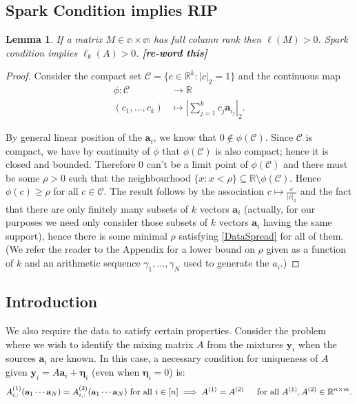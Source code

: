 \documentclass[journal, onecolumn]{IEEEtran}
\newtheorem{lemma}{Lemma}
\begin{document}
\subsection{Spark Condition implies RIP}

\begin{lemma}
If a matrix $M \in \mathbb{n \times m}$ has full column rank then $\ell(M) > 0$. Spark condition implies $\ell_k(A) > 0$. \textbf{[re-word this]}
\end{lemma}

\begin{proof}
Consider the compact set $\mathcal{C} = \{c \in \mathbb{R}^k: |c|_2 = 1\}$ and the continuous map
\begin{align*}
\phi: \mathcal{C} &\to \mathbb{R} \\
(c_1, \ldots, c_k) &\mapsto |\sum_{j = 1}^k c_j \mathbf{a}_{i_j}|_2.
\end{align*}

By general linear position of the $\mathbf{a}_i$, we know that $0 \notin \phi(\mathcal{C})$. Since $\mathcal{C}$ is compact, we have by continuity of $\phi$ that $\phi(\mathcal{C})$ is also compact; hence it is closed and bounded. Therefore $0$ can't be a limit point of $\phi(\mathcal{C})$ and there must be some $\rho > 0$ such that the neighbourhood $\{x: x < \rho\} \subseteq \mathbb{R} \setminus \phi(\mathcal{C})$. Hence $\phi(c) \geq \rho$ for all $c \in \mathcal{C}$. The result follows by the association $c \mapsto \frac{c}{|c|_2}$ and the fact that there are only finitely many subsets of $k$ vectors $\mathbf{a}_i$ (actually, for our purposes we need only consider those subsets of $k$ vectors $\mathbf{a}_i$ having the same support), hence there is some minimal $\rho$ satisfying \eqref{DataSpread} for all of them. (We refer the reader to the Appendix for a lower bound on $\rho$ given as a function of $k$ and an arithmetic sequence $\gamma_1, \ldots, \gamma_N$ used to generate the $a_i$.)
\end{proof}


      
\subsection{Introduction}

We also require the data to satisfy certain properties. Consider the problem where we wish to identify the mixing matrix $A$ from the mixtures $\mathbf{y}_i$ when the sources $\mathbf{a}_i$ are known. In this case, a necessary condition for uniqueness of $A$ given $\mathbf{y}_i = A \mathbf{a}_i + \mathbf{\eta}_i$ (even when $\mathbf{\eta}_i=0$) is:
\begin{align}\label{SparkCondition2}
A^{(1)}_{i,:}(\mathbf{a}_1 \cdots \mathbf{a}_N) = A^{(2)}_{i,:}(\mathbf{a}_1 \cdots \mathbf{a}_N)  \text{ for all } i \in [n] \implies A^{(1)}  = A^{(2)} \indent \text{for all } A^{(1)}, A^{(2)} \in \mathbb{R}^{n \times m}.
\end{align}
\end{document}

